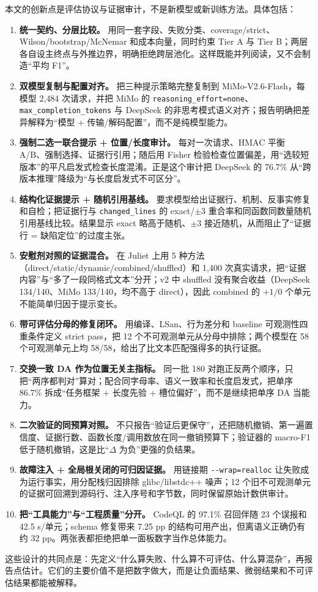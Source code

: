 \documentclass[conference]{IEEEtran}
\begin{document}
本文的创新点是评估协议与证据审计，不是新模型或新训练方法。具体包括：
\begin{enumerate}
    \item \textbf{统一契约、分层比较。} 用同一套字段、失败分类、coverage/strict、Wilson/bootstrap/McNemar 和成本向量，同时约束 Tier A 与 Tier B；两层各自设主终点与外推边界，明确拒绝跨层池化。这样既能并列阅读，又不会制造“平均 F1”。
    \item \textbf{双模型复制与配置对齐。} 把三种提示策略完整复制到 MiMo-V2.6-Flash，每模型 2{,}484 次请求，并把 MiMo 的 \texttt{reasoning\_effort=none}、\texttt{max\_completion\_tokens} 与 DeepSeek 的非思考模式语义对齐；报告明确把差异解释为“模型 + 传输/解码配置”，而不是纯模型能力。
    \item \textbf{强制二选一联合提示 + 位置/长度审计。} 每对一次请求、HMAC 平衡 A/B、强制选择、证据行引用；随后用 Fisher 检验检查位置偏差，用“选较短版本”的平凡启发式检查长度混淆。正是这个审计把 DeepSeek 的 76.7\% 从“跨版本推理”降级为“与长度启发式不可区分”。
    \item \textbf{结构化证据提示 + 随机引用基线。} 要求模型给出证据行、机制、反事实修复和自检；把证据行与 \texttt{changed\_lines} 的 exact/$\pm3$ 重合率和同函数同数量随机引用基线比较。结果显示 exact 略高于随机、$\pm3$ 接近随机，从而阻止了“证据行 = 缺陷定位”的过度主张。
    \item \textbf{安慰剂对照的证据混合。} 在 Juliet 上用 5 种方法（direct/static/dynamic/combined/shuffled）和 1{,}400 次真实请求，把“证据内容”与“多了一段同格式文本”分开；v2 中 shuffled 没有聚合收益（DeepSeek 134/140、MiMo 133/140，均不高于 direct），因此 combined 的 $+1/0$ 个单元不能简单归因于提示变长。
    \item \textbf{带可评估分母的修复闭环。} 用编译、LSan、行为差分和 baseline 可观测性四重条件定义 strict pass，把 12 个不可观测单元从分母中排除；两个模型在 58 个可观测单元上均 58/58，给出了比文本匹配强得多的执行证据。
    \item \textbf{交换一致 DA 作为位置无关主指标。} 同一批 180 对跑正反两个顺序，只把“两序都判对”算对；配合同字母率、语义一致率和长度启发式，把单序 86.7\% 拆成“任务框架 + 长度先验 + 槽位偏好”，而不是继续把单序 DA 当能力。
    \item \textbf{二次验证的同预算对照。} 不只报告“验证后更保守”，还把随机撤销、第一遍置信度、证据行数、函数长度/调用数放在同一撤销预算下；验证器的 macro-F1 低于随机撤销，这是比“$\Delta$ 为负”更强的负结果。
    \item \textbf{故障注入 + 全局根关闭的可归因证据。} 用链接期 \texttt{-{}-wrap=realloc} 让失败成为运行事实，用分配栈归因排除 glibc/libstdc++ 噪声；12 个旧不可观测单元的证据可回溯到源码行、注入序号和字节数，同时保留原始计数供审计。
    \item \textbf{把“工具能力”与“工程质量”分开。} CodeQL 的 97.1\% 召回伴随 23 个误报和 42.5 s/单元；schema 修复带来 7.25 pp 的结构可用产出，但离语义正确仍有约 32 pp。两张表都拒绝把单一面板数字当作总体能力。
\end{enumerate}
这些设计的共同点是：先定义“什么算失败、什么算不可评估、什么算混杂”，再报告点估计。它们的主要价值不是把数字做大，而是让负面结果、微弱结果和不可评估结果都能被解释。
\end{document}
